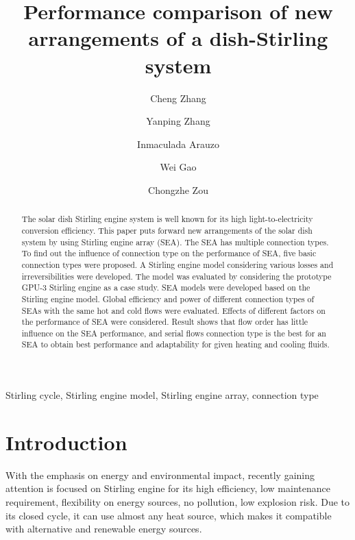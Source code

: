 \documentclass[review,3p,10t]{elsarticle}
\begin{document}
\begin{frontmatter}
\title{Performance comparison of new arrangements of a dish-Stirling system}
\date{}
\author[label1]{Cheng Zhang}
\author[label1]{Yanping Zhang}
\author[label2]{Inmaculada Arauzo}
\author[label1]{Wei Gao}
\author[label1]{Chongzhe Zou}


\address[label1]{School of Energy and Power Engineering, Huazhong University of Science and Technology, Wuhan, China}
\address[label2]{CIRCE Research Institute, University of Zaragoza, Maria de Luna, Zaragoza, Spain}

\begin{abstract}
The solar dish Stirling engine system is well known for its high light-to-electricity conversion efficiency. This paper puts forward new arrangements of the solar dish system by using Stirling engine array (SEA). The SEA has multiple connection types. To find out the influence of connection type on the performance of SEA, five basic connection types were proposed. A Stirling engine model considering various losses and irreversibilities were developed. The model was evaluated by considering the prototype GPU-3 Stirling engine as a case study. SEA models were developed based on the Stirling engine model. Global efficiency and power of different connection types of SEAs with the same hot and cold flows were evaluated. Effects of different factors on the performance of SEA were considered. Result shows that flow order has little influence on the SEA performance, and serial flows connection type is the best for an SEA to obtain best performance and adaptability for given heating and cooling fluids.
\end{abstract}

\begin{keyword}Stirling cycle, Stirling engine model, Stirling engine array, connection type
\end{keyword}

\end{frontmatter}

\linenumbers

\section{Introduction}
With the emphasis on energy and environmental impact, recently gaining attention is focused on Stirling engine for its high efficiency, low maintenance requirement, flexibility on energy sources, no pollution, low explosion risk. Due to its closed cycle, it can use almost any heat source, which makes it compatible with alternative and renewable energy sources. 
\end{document}
